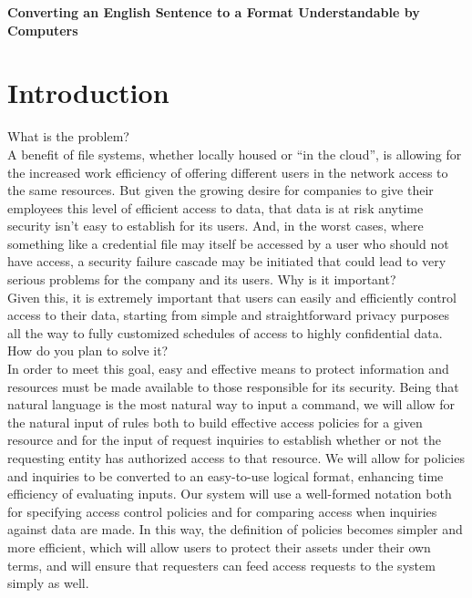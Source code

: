 \documentclass[12pt]{article}
\begin{document}

\begin{center}
\textbf{Converting an English Sentence to a Format Understandable by Computers}
\end{center}

\section{Introduction}
What is the problem? \\
A benefit of file systems, whether locally housed or “in the cloud”, is allowing for the increased work efficiency of offering different users in the network access to the same resources. But given the growing desire for companies to give their employees this level of efficient access to data, that data is at risk anytime security isn’t easy to establish for its users. And, in the worst cases, where something like a credential file may itself be accessed by a user who should not have access, a security failure cascade may be initiated that could lead to very serious problems for the company and its users.
Why is it important? \\
Given this, it is extremely important that users can easily and efficiently control access to their data, starting from simple and straightforward privacy purposes all the way to fully customized schedules of access to highly confidential data.
How do you plan to solve it? \\
In order to meet this goal, easy and effective means to protect information and resources must be made available to those responsible for its security. 
Being that natural language is the most natural way to input a command, we will allow for the natural input of rules both to build effective access policies for a given resource and for the input of request inquiries to establish whether or not the requesting entity has authorized access to that resource.
We will allow for policies and inquiries to be converted to an easy-to-use logical format, enhancing time efficiency of evaluating inputs. 
Our system will use a well-formed notation both for specifying access control policies and for comparing access when inquiries against data are made.
In this way, the definition of policies becomes simpler and more efficient, which will allow users to protect their assets under their own terms, and will ensure that requesters can feed access requests to the system simply as well.
\end{document}
